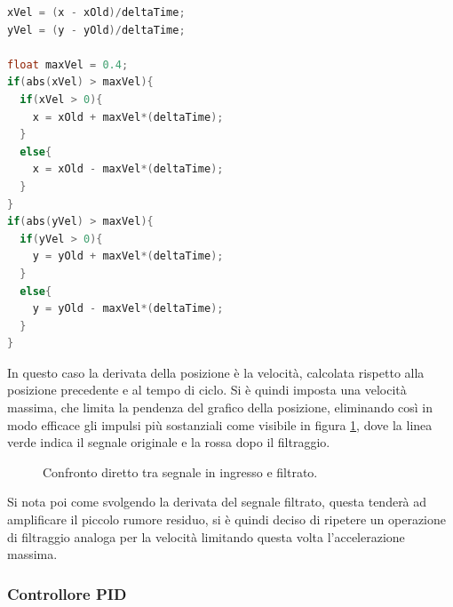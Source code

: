\documentclass[12pt,twoside,openright]{article}
\begin{document}
\begin{lstlisting}[language=C]
xVel = (x - xOld)/deltaTime;
yVel = (y - yOld)/deltaTime;

float maxVel = 0.4;
if(abs(xVel) > maxVel){
  if(xVel > 0){
    x = xOld + maxVel*(deltaTime);
  }
  else{
    x = xOld - maxVel*(deltaTime);
  }
}
if(abs(yVel) > maxVel){
  if(yVel > 0){
    y = yOld + maxVel*(deltaTime);
  }
  else{
    y = yOld - maxVel*(deltaTime);
  }
}
\end{lstlisting}
In questo caso la derivata della posizione è la velocità, calcolata rispetto alla posizione precedente e al tempo di ciclo. Si è quindi imposta una velocità massima, che limita la pendenza del grafico della posizione, eliminando così in modo efficace gli impulsi più sostanziali come visibile in figura \ref{fig:filtraggioposizione}, dove la linea verde indica il segnale originale e la rossa dopo il filtraggio.
\begin{figure}[h!]
\centering
{}
\caption{Confronto diretto tra segnale in ingresso e filtrato.} \label{fig:filtraggioposizione}
\end{figure}
Si nota poi come svolgendo la derivata del segnale filtrato, questa tenderà ad amplificare il piccolo rumore residuo, si è quindi deciso di ripetere un operazione di filtraggio analoga per la velocità limitando questa volta l'accelerazione massima.

\subsubsection{Controllore PID}
\end{document}
